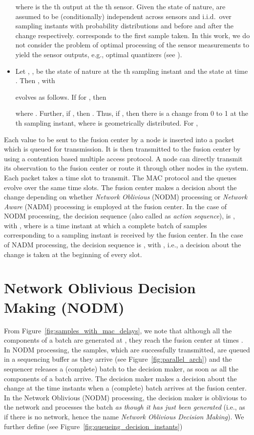 \documentclass[acmtosn]{acmtrans2m}
\begin{document}
\begin{itemize}
  where  is the th output at the th sensor. 
  Given the state of nature,  are assumed to be (conditionally) 
  independent across sensors and i.i.d.\ over sampling instants 
  with probability distributions  and  before and
  after the change respectively.  corresponds to the
  first sample taken.  In this work, we do not consider the problem of
  optimal processing of the sensor measurements to yield the sensor
  outputs, e.g., optimal quantizers (see \cite{veeravalli01decentralized-quickest}).


\item[] Let , , be the state of nature at the th 
  sampling instant and
   the state at time . Then , with
  
   evolves as follows. 
  If  for , then
  
  where .
  Further, if , then . Thus, if , then there
  is a change from 0 to 1 at the th sampling instant, where   is geometrically
  distributed. For ,
  
\end{itemize}

Each value to be sent to the fusion center by a node is inserted into a packet
which is queued for transmission. It is then transmitted to the fusion center 
by using a contention based multiple access protocol. A node can directly 
transmit its observation to the fusion center or route it through other nodes 
in the system. Each packet takes a time slot to transmit.  The MAC protocol and the queues 
evolve over the same time slots. The fusion center makes a decision about
the change depending on whether {\em Network Oblivious} ({\sf NODM}) processing 
or {\em Network Aware} ({\sf NADM}) processing is employed at the fusion center. 
In the case of {\sf NODM} processing, the decision sequence (also called as 
{\em action sequence}), is , with  
 ,
where  is a time instant at which a complete batch of  samples corresponding 
to a sampling instant is received by the fusion center. In the case of {\sf NADM} 
processing, the decision sequence is , with  
 ,
i.e., a decision about the change is taken at the beginning of every slot. 


\section{Network Oblivious Decision Making ({\sf NODM})}
\label{sec:no}
From Figure~\ref{fig:samples_with_mac_delays}, we note that
although all the components of a batch  are generated at 
, they reach the fusion center at times 
. In {\sf NODM} processing, 
the samples, which are successfully transmitted, are queued 
in a sequencing buffer as they arrive 
(see Figure~\ref{fig:parallel_arch}) and the sequencer releases 
a (complete) batch to the decision maker, as soon as all the 
components of a batch arrive. The decision maker 
makes a decision about the change at the time instants when a 
(complete) batch arrives at the fusion center. In the 
Network Oblivious ({\sf NODM}) processing, the decision maker 
is oblivious to the network and processes the 
batch {\em as though it has just been generated} 
(i.e., as if there is no network, hence the name {\em Network Oblivious Decision Making}). 
We further define (see Figure~\ref{fig:queueing_decision_instants})
\end{document}
